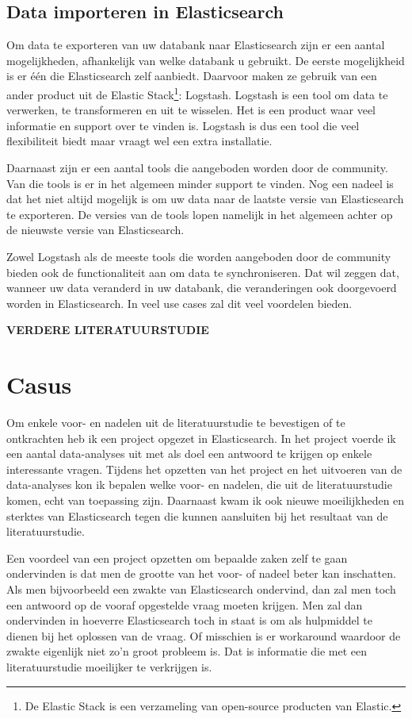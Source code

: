 \subsection{Data importeren in Elasticsearch}

Om data te exporteren van uw databank naar Elasticsearch zijn er een aantal mogelijkheden, afhankelijk van welke databank u gebruikt. De eerste mogelijkheid is er één die Elasticsearch zelf aanbiedt. Daarvoor maken ze gebruik van een ander product uit de Elastic Stack\footnote{De Elastic Stack is een verzameling van open-source producten van Elastic.}: Logstash. Logstash is een tool om data te verwerken, te transformeren en uit te wisselen. Het is een product waar veel informatie en support over te vinden is. Logstash is dus een tool die veel flexibiliteit biedt maar vraagt wel een extra installatie. 

Daarnaast zijn er een aantal tools die aangeboden worden door de community. Van die tools is er in het algemeen minder support te vinden. Nog een nadeel is dat het niet altijd mogelijk is om uw data naar de laatste versie van Elasticsearch te exporteren. De versies van de tools lopen namelijk in het algemeen achter op de nieuwste versie van Elasticsearch. 

Zowel Logstash als de meeste tools die worden aangeboden door de community bieden ook de functionaliteit aan om data te synchroniseren. Dat wil zeggen dat, wanneer uw data veranderd in uw databank, die veranderingen ook doorgevoerd worden in Elasticsearch. In veel use cases zal dit veel voordelen bieden. 

\textbf{VERDERE LITERATUURSTUDIE}

\section{Casus}

Om enkele voor- en nadelen uit de literatuurstudie te bevestigen of te ontkrachten heb ik een project opgezet in Elasticsearch. In het project voerde ik een aantal data-analyses uit met als doel een antwoord te krijgen op enkele interessante vragen. Tijdens het opzetten van het project en het uitvoeren van de data-analyses kon ik bepalen welke voor- en nadelen, die uit de literatuurstudie komen, echt van toepassing zijn. Daarnaast kwam ik ook nieuwe moeilijkheden en sterktes van Elasticsearch tegen die kunnen aansluiten bij het resultaat van de literatuurstudie.

Een voordeel van een project opzetten om bepaalde zaken zelf te gaan ondervinden is dat men de grootte van het voor- of nadeel beter kan inschatten. Als men bijvoorbeeld een zwakte van Elasticsearch ondervind, dan zal men toch een antwoord op de vooraf opgestelde vraag moeten krijgen. Men zal dan ondervinden in hoeverre Elasticsearch toch in staat is om als hulpmiddel te dienen bij het oplossen van de vraag. Of misschien is er workaround waardoor de zwakte eigenlijk niet zo'n groot probleem is. Dat is informatie die met een literatuurstudie moeilijker te verkrijgen is.

